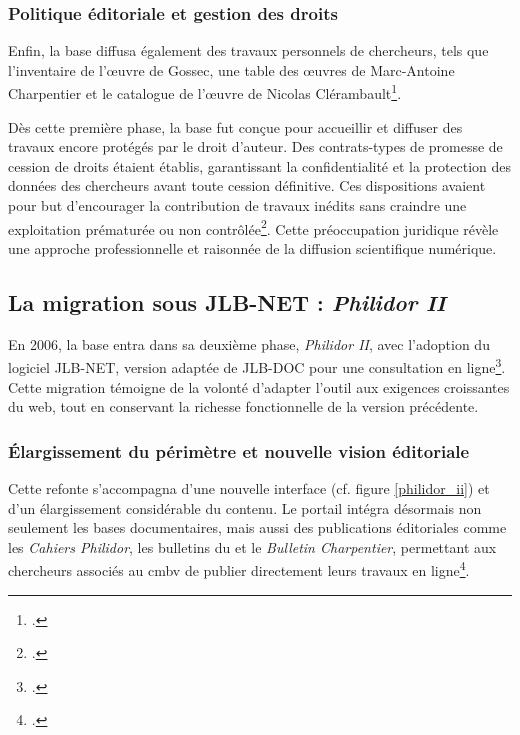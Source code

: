 \subsubsection{Politique éditoriale et gestion des droits}

Enfin, la base diffusa également des travaux personnels de chercheurs, tels que l'inventaire de l'œuvre de Gossec, une table des œuvres de Marc-Antoine Charpentier et le catalogue de l'œuvre de Nicolas Clérambault\footcite[Conseil scientifique, bilan de l'année 2001]{michelbenoitDocumentationTechniqueBibliographique1997}.

Dès cette première phase, la base fut conçue pour accueillir et diffuser des travaux encore protégés par le droit d'auteur. Des contrats-types de promesse de cession de droits étaient établis, garantissant la confidentialité et la protection des données des chercheurs avant toute cession définitive. Ces dispositions avaient pour but d'encourager la contribution de travaux inédits sans craindre une exploitation prématurée ou non contrôlée\footcite[Conseil scientifique, bilan de l'année 2001]{michelbenoitDocumentationTechniqueBibliographique1997}. Cette préoccupation juridique révèle une approche professionnelle et raisonnée de la diffusion scientifique numérique.

\subsection{La migration sous JLB-NET : \textit{Philidor II}}

En 2006, la base entra dans sa deuxième phase, \textit{Philidor II}, avec l'adoption du logiciel JLB-NET, version adaptée de JLB-DOC pour une consultation en ligne\footcite[Rapport sur le projet Philidor de Jérémie Crublet, juin 2006]{michelbenoitDocumentationTechniqueBibliographique1997}. Cette migration témoigne de la volonté d'adapter l'outil aux exigences croissantes du web, tout en conservant la richesse fonctionnelle de la version précédente.

\subsubsection{Élargissement du périmètre et nouvelle vision éditoriale}

Cette refonte s'accompagna d'une nouvelle interface (cf. figure \ref{philidor_ii}) et d'un élargissement considérable du contenu. Le portail intégra désormais non seulement les bases documentaires, mais aussi des publications éditoriales comme les \textit{Cahiers Philidor}, les bulletins du  et le \textit{Bulletin Charpentier}, permettant aux chercheurs associés au \gls{cmbv} de publier directement leurs travaux en ligne\footcite[Présentation de la base de données PHILIDOR en Octobre 2010]{michelbenoitDocumentationTechniqueBibliographique1997}.

